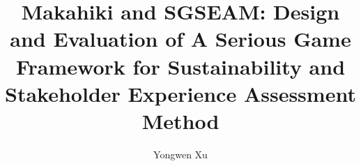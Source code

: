 \documentclass[11pt,final,dissertation,actual,subfigure]{uhthesis}
\def\keywords{
\vspace{.5em}
{\textit{Keywords}:\,\relax%
}}
\begin{document}
\title{Makahiki and SGSEAM: Design and Evaluation of A Serious Game Framework for Sustainability and Stakeholder Experience Assessment Method}
\author{Yongwen Xu}



\maketitle


\begin{frontmatter}


\copyrightpage







\listoffixmes

\tableofcontents

\listoftables

\listoffigures

\end{frontmatter}
\end{document}
